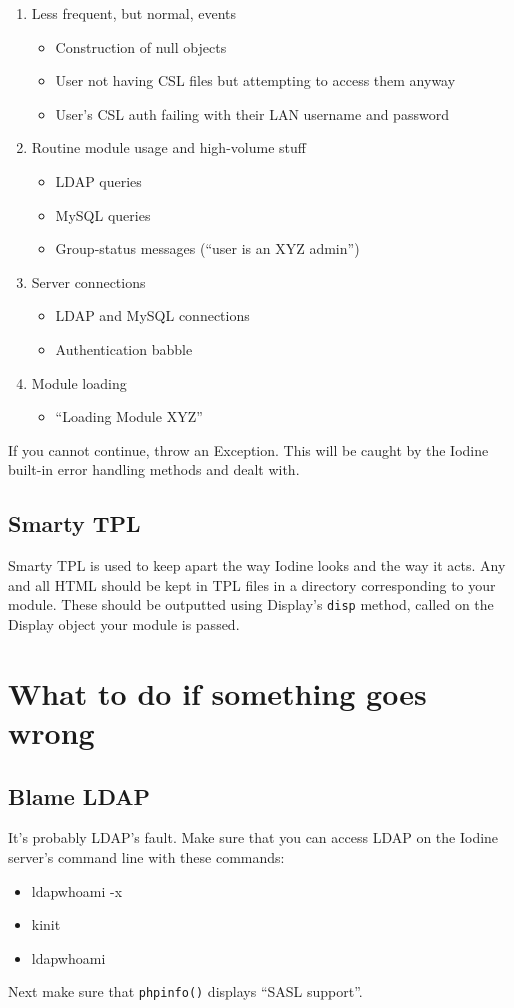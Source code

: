 \documentclass[11pt,letterpaper]{report}
\begin{document}
\begin{enumerate}
\item Less frequent, but normal, events
	\begin{itemize}
		\item Construction of null objects
		\item User not having CSL files but attempting to access them anyway
		\item User's CSL auth failing with their LAN username and password
	\end{itemize}
	
\item Routine module usage and high-volume stuff
	\begin{itemize}
		\item LDAP queries
		\item MySQL queries
		\item Group-status messages (``user is an XYZ admin'')
	\end{itemize}
\item Server connections
	\begin{itemize}
		\item LDAP and MySQL connections
		\item Authentication babble
	\end{itemize}
\item Module loading
	\begin{itemize}
		\item ``Loading Module XYZ''
	\end{itemize}
\end{enumerate}
If you cannot continue, throw an Exception.  This will be caught by the Iodine
built-in error handling methods and dealt with.
\subsection{Smarty TPL}
Smarty TPL is used to keep apart the way Iodine looks and the way it acts.
Any and all HTML should be kept in TPL files in a directory corresponding
to your module.  These should be outputted using Display's \lstinline{disp}
method, called on the Display object your module is passed.
\section{What to do if something goes wrong}
\subsection{Blame LDAP}
It's probably LDAP's fault.  Make sure that you can access LDAP on the Iodine
server's command line with these commands:
\begin{itemize}
	\item ldapwhoami -x
	\item kinit
	\item ldapwhoami
\end{itemize}
Next make sure that \lstinline{phpinfo()} displays ``SASL support''.
\end{document}
